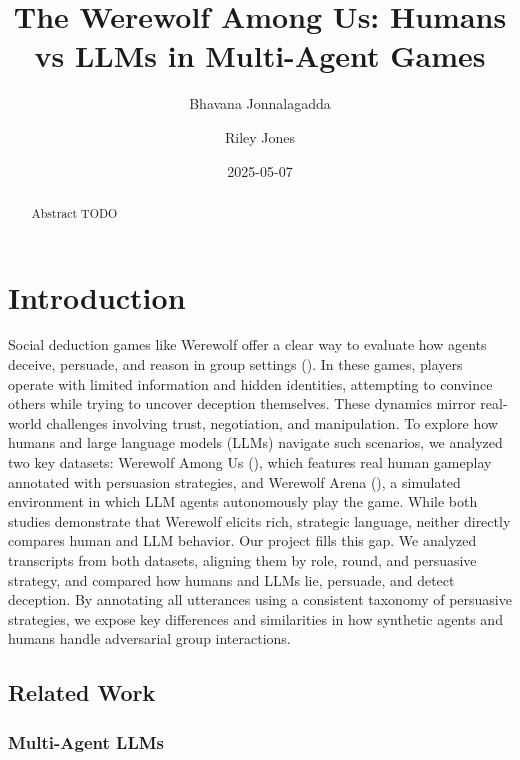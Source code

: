 \documentclass[
  letterpaper,
  DIV=11,
  numbers=noendperiod]{scrreprt}
\title{The Werewolf Among Us: Humans vs LLMs in Multi-Agent Games}
\author{Bhavana Jonnalagadda \and Riley Jones}
\date{2025-05-07}
\renewcommand*\contentsname{Table of contents}
\newcommand\contentsname{Table of contents}
\begin{document}
\maketitle
\begin{abstract}
Abstract TODO
\end{abstract}

\renewcommand*\contentsname{Table of contents}
{
\hypersetup{linkcolor=}
\setcounter{tocdepth}{2}
\tableofcontents
}

\chapter{Introduction}\label{introduction}

Social deduction games like Werewolf offer a clear way to evaluate how
agents deceive, persuade, and reason in group settings
(). In these
games, players operate with limited information and hidden identities,
attempting to convince others while trying to uncover deception
themselves. These dynamics mirror real-world challenges involving trust,
negotiation, and manipulation. To explore how humans and large language
models (LLMs) navigate such scenarios, we analyzed two key datasets:
Werewolf Among Us (), which features real human gameplay annotated with persuasion
strategies, and Werewolf Arena
(), a simulated environment in which LLM agents autonomously play
the game. While both studies demonstrate that Werewolf elicits rich,
strategic language, neither directly compares human and LLM behavior.
Our project fills this gap. We analyzed transcripts from both datasets,
aligning them by role, round, and persuasive strategy, and compared how
humans and LLMs lie, persuade, and detect deception. By annotating all
utterances using a consistent taxonomy of persuasive strategies, we
expose key differences and similarities in how synthetic agents and
humans handle adversarial group interactions.

\section{Related Work}\label{related-work}

\subsection{Multi-Agent LLMs}\label{multi-agent-llms}
\end{document}
